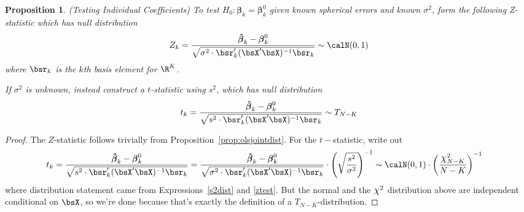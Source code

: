\documentclass[12pt]{article}
\theoremstyle{plain}
\newtheorem{prop}[thm]{Proposition}
\theoremstyle{definition}
\theoremstyle{remark}
\newcommand*{\Chi}{\mbox{\large$\chi$}} %
\newcommand{\bsbeta}{\boldsymbol{\beta}}
\newcommand{\bshatbeta}{\boldsymbol{\hat{\beta}}}
\begin{document}
\begin{prop}\emph{(Testing Individual Coefficients)}
\label{prop:coefftest}
To test $H_0:\bsbeta_k=\bsbeta_{k}^0$ given known spherical errors and
known $\sigma^2$, form the following Z-statistic which has null
distribution
\begin{align}
  Z_k = \frac{\bshatbeta_{k} - \bsbeta_{k}^0}{%
      \sqrt{\sigma^2\cdot \bsr_k'(\bsX'\bsX)^{-1}\bsr_k}}
      \sim \calN(0,1)
  \label{ztest}
\end{align}
where $\bsr_k$ is the $k$th basis element for $\R^K$.

If $\sigma^2$ is unknown, instead construct a $t$-statistic using $s^2$,
which has null distribution
\begin{align*}
  t_k = \frac{\bshatbeta_{k} - \bsbeta_{k}^0}{%
      \sqrt{s^2 \cdot \bsr_k'(\bsX'\bsX)^{-1}\bsr_k}}
    \sim T_{N-K}
\end{align*}
\end{prop}
\begin{proof}
The $Z$-statistic follows trivially from
Proposition~\ref{prop:olsjointdist}.
For the $t-$statistic, write out
\begin{align*}
  t_k =
  \frac{\bshatbeta_{k} - \bsbeta_{k}^0}{%
      \sqrt{s^2 \cdot \bsr_k'(\bsX'\bsX)^{-1}\bsr_k}}
  &=
  \frac{\bshatbeta_{k} - \bsbeta_{k}^0}{%
      \sqrt{\sigma^2 \cdot \bsr_k'(\bsX'\bsX)^{-1}\bsr_k}}
  \cdot
  \left(
  \sqrt{%
  \frac{s^2}{\sigma^2}
  }
  \right)^{-1}
  \sim
  \calN(0,1)
  \cdot
  \left(
  \frac{\Chi^2_{N-K}}{N-K}
  \right)^{-1}
\end{align*}
where distribution statement came from Expressions~\ref{s2dist} and
\ref{ztest}.
But the normal and the $\Chi^2$ distribution above are independent
conditional on $\bsX$, so we're done because that's exactly the
definition of a $T_{N-K}$-distribution.
\end{proof}
\end{document}

